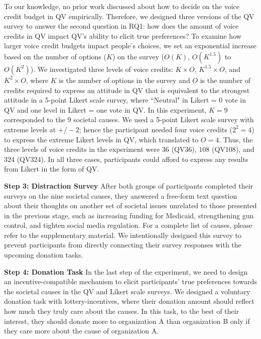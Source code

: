 To our knowledge, no prior work discussed about how to decide on the voice credit budget in QV empirically. Therefore, we designed three versions of the QV survey to answer the second question in RQ1: how does the amount of voice credits in QV impact QV's ability to elicit true preferences? To examine how larger voice credit budgets impact people's choices, we set an exponential increase based on the number of options ($K$) on the survey ($O(K)$, $O(K^{1.5})$ to $O(K^2)$). We investigated three levels of voice credits: $K \times O$, $K^{1.5} \times O$, and $K^2 \times O$, where $K$ is the number of options in the survey and $O$ is the number of credits required to express an attitude in QV that is equivalent to the strongest attitude in a 5-point Likert scale survey, where ``Neutral" in Likert = 0 vote in QV and one level in Likert = one vote in QV. In this experiment, $K=9$ corresponded to the $9$ societal causes. We used a 5-point Likert scale survey with extreme levels at $+/-2$; hence the participant needed four voice credits ($2^2=4$) to express the extreme Likert levels in QV, which translated to $O=4$. Thus, the three levels of voice credits in the experiment were $36$ (QV36), $108$ (QV108), and $324$ (QV324). In all three cases, participants could afford to express any results from Likert in the form of QV. 


\textbf{Step 3: Distraction Survey} After both groups of participants completed their surveys on the nine societal causes, they answered a free-form text question about their thoughts on another set of societal issues unrelated to those presented in the previous stage, such as increasing funding for Medicaid, strengthening gun control, and tighten social media regulation. For a complete list of causes, please refer to the supplementary material. We intentionally designed this survey to prevent participants from directly connecting their survey responses with the upcoming donation tasks. 

\textbf{Step 4: Donation Task} In the last step of the experiment, we need to design an incentive-compatible mechanism to elicit participants' true preferences towards the societal causes in the QV and Likert scale surveys. We designed a voluntary donation task with lottery-incentives, where their donation amount should reflect how much they truly care about the causes. In this task, to the best of their interest, they should donate more to organization A than organization B only if they care more about the cause of organization A. 

